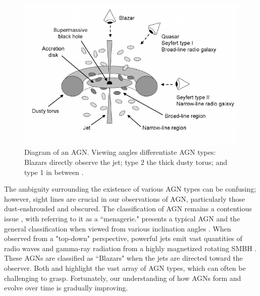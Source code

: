 \begin{figure}[t!]
    \centering
    \includegraphics[width=\linewidth]{Figures/agn_diagram.png}
    \caption{Diagram of an AGN. Viewing angles differentiate AGN types: Blazars directly observe the jet; type 2 the thick dusty torus; and type 1 in between \citep{zackrisson_quasars_2005}.}
    \label{Fig: AGN Diagram}
\end{figure}

The ambiguity surrounding the existence of various AGN types can be confusing; however, sight lines are crucial in our observations of AGN, particularly those dust-enshrouded and obscured. The classification of AGN remains a contentious issue \citep{padovani_active_2017}, with \cite{hickox_obscured_2018} referring to it as a ``menagerie."  presents a typical AGN and the general classification when viewed from various inclination angles \citep{zackrisson_quasars_2005}. When observed from a "top-down" perspective, powerful jets emit vast quantities of radio waves and gamma-ray radiation from a highly magnetized rotating SMBH \citep{blandford_relativistic_2019}. These AGNs are classified as ``Blazars" when the jets are directed toward the observer. Both \cite{peterson_introduction_1997} and \cite{tadhunter_introduction_2008} highlight the vast array of AGN types, which can often be challenging to grasp. Fortunately, our understanding of how AGNs form and evolve over time is gradually improving.


